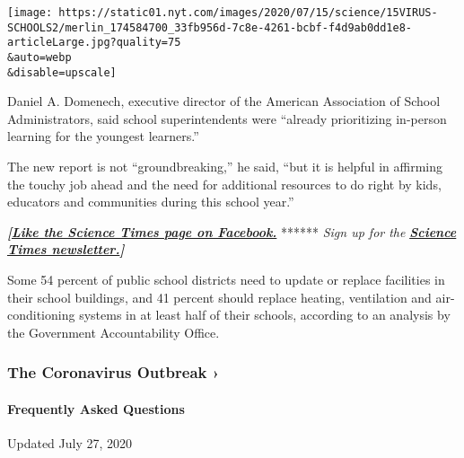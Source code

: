 \texttt{[image: https://static01.nyt.com/images/2020/07/15/science/15VIRUS-SCHOOLS2/merlin\_174584700\_33fb956d-7c8e-4261-bcbf-f4d9ab0dd1e8-articleLarge.jpg?quality=75\\\&auto=webp\\\&disable=upscale]}

Daniel A. Domenech, executive director of the American Association of
School Administrators, said school superintendents were ``already
prioritizing in-person learning for the youngest learners.''

The new report is not ``groundbreaking,'' he said, ``but it is helpful
in affirming the touchy job ahead and the need for additional resources
to do right by kids, educators and communities during this school
year.''

\textbf{\emph{{[}}\href{http://on.fb.me/1paTQ1h}{\emph{Like the Science
Times page on Facebook.}}} ****** \emph{\textbar{} Sign up for the}
\textbf{\href{http://nyti.ms/1MbHaRU}{\emph{Science Times
newsletter.}}\emph{{]}}}

Some 54 percent of public school districts need to update or replace
facilities in their school buildings, and 41 percent should replace
heating, ventilation and air-conditioning systems in at least half of
their schools, according to an analysis by the Government Accountability
Office.

\href{https://www.nytimes.com/news-event/coronavirus?action=click\&pgtype=Article\&state=default\&region=MAIN_CONTENT_3\&context=storylines_faq}{}

\hypertarget{the-coronavirus-outbreak-}{%
\subsubsection{The Coronavirus Outbreak
›}\label{the-coronavirus-outbreak-}}

\hypertarget{frequently-asked-questions}{%
\paragraph{Frequently Asked
Questions}\label{frequently-asked-questions}}

Updated July 27, 2020

